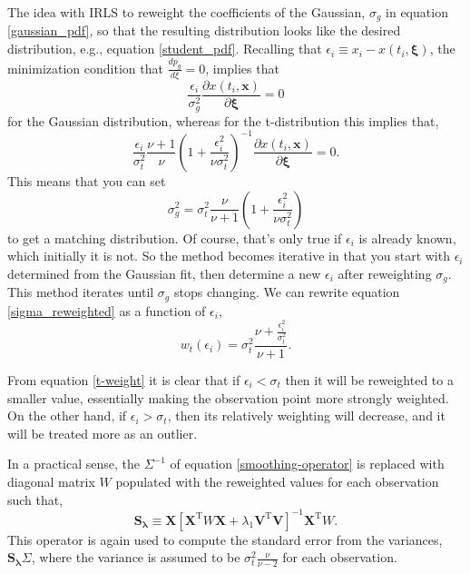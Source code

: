 \documentclass[twocol]{ametsoc}
\begin{document}
The idea with IRLS to reweight the coefficients of the Gaussian, $\sigma_g$ in equation \ref{gaussian_pdf}, so that the resulting distribution looks like the desired distribution, e.g., equation \ref{student_pdf}. Recalling that $\epsilon_i \equiv x_i - x(t_i,\mathbf{\xi})$, the minimization condition that $\frac{d p_g}{d\xi}=0$, implies that
\begin{equation}
\frac{\epsilon_i}{\sigma_g^2} \frac{\partial x(t_i,\mathbf{x})}{\partial \mathbf{\xi}} = 0
\end{equation}
for the Gaussian distribution, whereas for the t-distribution this implies that,
\begin{equation}
 \frac{\epsilon_i}{\sigma_t^2} \frac{\nu+1}{\nu} \left( 1 + \frac{\epsilon_i^2}{\nu \sigma_t^2} \right)^{-1}  \frac{\partial x(t_i,\mathbf{x})}{\partial \mathbf{\xi}}  = 0.
\end{equation}
This means that you can set
\begin{equation}
\sigma_g^2 =   \sigma_t^2 \frac{\nu}{\nu+1} \left( 1 + \frac{\epsilon_i^2}{\nu \sigma_t^2} \right)
\label{sigma_reweighted}
\end{equation}
to get a matching distribution. Of course, that's only true if $\epsilon_i$ is already known, which initially it is not. So the method becomes iterative in that you start with $\epsilon_i$ determined from the Gaussian fit, then determine a new $\epsilon_i$ after reweighting $\sigma_g$. This method iterates until $\sigma_g$ stops changing. We can rewrite equation \ref{sigma_reweighted} as a function of $\epsilon_i$,
\begin{equation}
\label{t-weight}
w_t(\epsilon_i) = \sigma_t^2 \frac{\nu  + \frac{\epsilon_i^2}{\sigma_t^2}}{\nu+1}.
\end{equation}

From equation \ref{t-weight} it is clear that if $\epsilon_i < \sigma_t$ then it will be reweighted to a smaller value, essentially making the observation point more strongly weighted. On the other hand, if $\epsilon_i > \sigma_t$, then its relatively weighting will decrease, and it will be treated more as an outlier.

In a practical sense, the $\Sigma^{-1}$ of equation \ref{smoothing-operator} is replaced with diagonal matrix $W$ populated with the reweighted values for each observation such that,
\begin{equation}
\label{general-smoothing-operator}
\mathbf{S_\lambda} \equiv \mathbf{X} \left[ \mathbf{X}^{\textrm{T}} W \mathbf{X} + \lambda_1 \mathbf{V}^{\textrm{T}} \mathbf{V} \right]^{-1} \mathbf{X}^{\textrm{T}} W.
\end{equation}
This operator is again used to compute the standard error from the variances,  $\mathbf{S_\lambda} \Sigma$, where the variance is assumed to be $\sigma_t^2 \frac{\nu}{\nu-2}$ for each observation.
\end{document}
